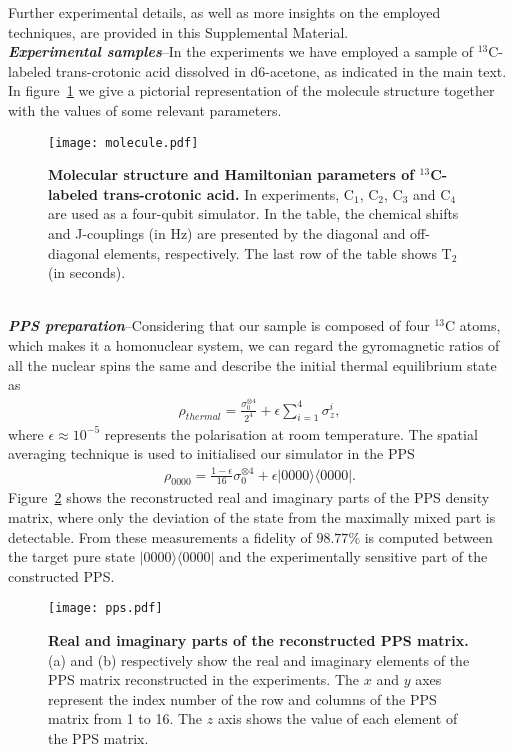 \documentclass[10pt,nofootinbib,notitlepage,twocolumn,superscriptaddress]{revtex4-1}
\theoremstyle{plain}
\theoremstyle{definition}
\newcommand{\bra}[1]{\mbox{$\langle #1|$}}
\newcommand{\ket}[1]{\ensuremath{|#1\rangle}}
\begin{document}
Further experimental details, as well as more insights on the employed techniques, are provided in this Supplemental Material. 
\\

{\it{\bfseries{Experimental samples}}}--In the experiments we have employed a sample of $^{13}$C-labeled trans-crotonic acid dissolved in d6-acetone, as indicated in the main text. In figure~\ref{molecule} we give a pictorial representation of the molecule structure together with the values of some relevant parameters. 
%
\begin{figure}[htb]
\begin{center}
\texttt{[image: molecule.pdf]}
\end{center}
\setlength{\abovecaptionskip}{-0.00cm}
\caption{\footnotesize{\textbf{Molecular structure and Hamiltonian parameters of $^{13}$C-labeled trans-crotonic acid.} In experiments, C$_1$, C$_2$, C$_3$ and C$_4$ are used as a four-qubit simulator. In the table, the chemical shifts and J-couplings (in Hz) are presented by the diagonal and off-diagonal elements, respectively. The last row of the table shows T$_{2}$ (in seconds).}}\label{molecule}
\end{figure}
\\

{\it{\bfseries{PPS preparation}}}--Considering that our sample is composed of four $^{13}$C atoms, which makes it a homonuclear system, we can regard the gyromagnetic ratios of all the nuclear spins the same and describe the initial thermal equilibrium state as
\begin{align}\label{thermal}
\rho_{thermal}=\frac{\sigma_0^{\otimes 4}}{2^4}+\epsilon\sum _{i=1}^4 \sigma_z^i,
\end{align}
where $\epsilon\approx 10^{-5}$ represents the polarisation at room temperature. The spatial averaging technique is used to initialised our simulator in the PPS 
\begin{align}\label{pps}
\rho_{0000}=\frac{1-\epsilon}{16}\sigma_0^{\otimes 4}+\epsilon\ket{0000}\bra{0000}.
\end{align}
Figure~\ref{pps} shows the reconstructed real and imaginary parts of the PPS density matrix, where only the deviation of the state from the maximally mixed part is detectable. From these measurements a fidelity of $98.77\%$ is computed between the target pure state $\ket{0000}\bra{0000}$ and the experimentally sensitive part of the constructed PPS.
 \begin{figure*}[htb]
\begin{center}
\texttt{[image: pps.pdf]}
\end{center}
\setlength{\abovecaptionskip}{-0.00cm}
\caption{\footnotesize{\textbf{Real and imaginary parts of the reconstructed PPS matrix.}  (a) and (b) respectively show the real and imaginary elements of the PPS matrix reconstructed in the experiments. The $x$ and $y$ axes represent the index number of the row and columns of the PPS matrix from 1 to 16. The $z$ axis shows the value of each element of the PPS matrix.}}\label{pps}
\end{figure*}
\\
\end{document}
